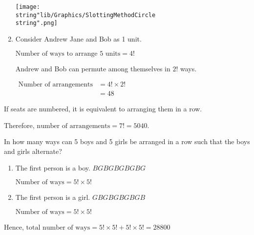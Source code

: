 \documentclass[11pt,a4paper]{book}
\begin{document}
\begin{example}
\begin{enumerate}[label=(\alph*)]
\begin{minipage}[t]{.6\textwidth}
\end{minipage}
\begin{minipage}[t]{.4\textwidth}
\begin{center}
\texttt{[image: \\string"lib/Graphics/SlottingMethodCircle\\string".png]}
\par\end{center}

\end{minipage}

\item  Consider Andrew Jane and Bob as 1 unit.

$\text{Number of ways to arrange 5 units}=4!$

Andrew and Bob can permute among themselves in $2!$ ways.

$
\begin{aligned}
\text{Number of arrangements} & =4!\times2!\\
 & =48
\end{aligned}
$

\end{enumerate}

If seats are numbered, it is equivalent to arranging them in a row.

Therefore, $\text{number of arrangements}=7!=5040$.

\end{example}

\newpage

\begin{example}

In how many ways can 5 boys and 5 girls be arranged in a row such
that the boys and girls alternate?

\Solution

\begin{enumerate}[label=Case \arabic*:,leftmargin=1.5cm]

\item The first person is a boy. \hspace{1cm}$BGBGBGBGBG$

$\text{Number of ways}=5!\times5!$

\item The first person is a girl. \hspace{1cm}$GBGBGBGBGB$

$\text{Number of ways}=5!\times5!$

\end{enumerate}

Hence, $\text{total number of ways}=5!\times5!+5!\times5!=28800$

\end{example}
\end{document}
